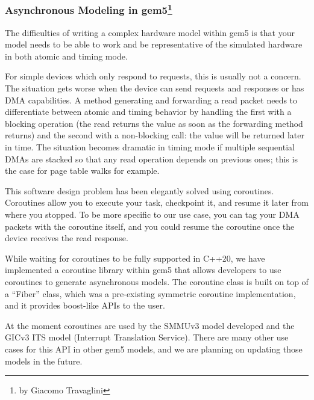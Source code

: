 \subsubsection[Asynchronous Modeling in gem5]{Asynchronous Modeling in gem5\footnote{by Giacomo Travaglini}}

The difficulties of writing a complex hardware model within gem5 is that your model needs to be able to work and be representative of the simulated hardware in both atomic and timing mode.

For simple devices which only respond to requests, this is usually not a concern.
The situation gets worse when the device can send requests and responses or has DMA capabilities.
A method generating and forwarding a read packet needs to differentiate between atomic and timing behavior by handling the first with a blocking operation (the read returns the value as soon as the forwarding method returns) and the second with a non-blocking call: the value will be returned later in time.
The situation becomes dramatic in timing mode if multiple sequential DMAs are stacked so that any read operation depends on previous ones; this is the case for page table walks for example.

This software design problem has been elegantly solved using coroutines.
Coroutines allow you to execute your task, checkpoint it, and resume it later from where you stopped.
To be more specific to our use case, you can tag your DMA packets with the coroutine itself, and you could resume the coroutine once the device receives the read response.

While waiting for coroutines to be fully supported in C++20, we have implemented a coroutine library within gem5 that allows developers to use coroutines to generate asynchronous models.
The coroutine class is built on top of a ``Fiber'' class, which was a pre-existing symmetric coroutine implementation, and it provides boost-like APIs to the user.

At the moment coroutines are used by the SMMUv3 model developed and the GICv3 ITS model (Interrupt Translation Service).
There are many other use cases for this API in other gem5 models, and we are planning on updating those models in the future.
